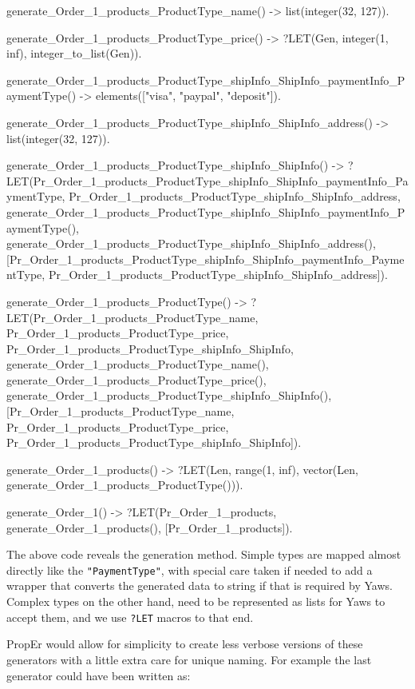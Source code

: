 \documentclass[submission,copyright]{eptcs}
\newcommand{\LET}{\texttt{?LET}\xspace}
\begin{document}
\begin{lsterlang}
generate_Order_1_products_ProductType_name() -> 
  list(integer(32, 127)).

generate_Order_1_products_ProductType_price() ->  
  ?LET(Gen, integer(1, inf), integer_to_list(Gen)).

generate_Order_1_products_ProductType_shipInfo_ShipInfo_paymentInfo_PaymentType() -> 
  elements(["visa", "paypal", "deposit"]).

generate_Order_1_products_ProductType_shipInfo_ShipInfo_address() -> 
  list(integer(32, 127)).

generate_Order_1_products_ProductType_shipInfo_ShipInfo() -> 
  ?LET({Pr_Order_1_products_ProductType_shipInfo_ShipInfo_paymentInfo_PaymentType,
        Pr_Order_1_products_ProductType_shipInfo_ShipInfo_address},
       {generate_Order_1_products_ProductType_shipInfo_ShipInfo_paymentInfo_PaymentType(),
        generate_Order_1_products_ProductType_shipInfo_ShipInfo_address()},
       [Pr_Order_1_products_ProductType_shipInfo_ShipInfo_paymentInfo_PaymentType,
        Pr_Order_1_products_ProductType_shipInfo_ShipInfo_address]).

generate_Order_1_products_ProductType() -> 
  ?LET({Pr_Order_1_products_ProductType_name, 
        Pr_Order_1_products_ProductType_price, 
        Pr_Order_1_products_ProductType_shipInfo_ShipInfo},
       {generate_Order_1_products_ProductType_name(), 
        generate_Order_1_products_ProductType_price(), 
        generate_Order_1_products_ProductType_shipInfo_ShipInfo()},
       [Pr_Order_1_products_ProductType_name, 
        Pr_Order_1_products_ProductType_price, 
        Pr_Order_1_products_ProductType_shipInfo_ShipInfo]).

generate_Order_1_products() -> 
  ?LET(Len, range(1, inf), vector(Len, generate_Order_1_products_ProductType())).

generate_Order_1() -> 
  ?LET(Pr_Order_1_products, generate_Order_1_products(), [Pr_Order_1_products]).
\end{lsterlang}

The above code reveals the generation method. Simple types are mapped
almost directly like the \texttt{"PaymentType"}, with special care
taken if needed to add a wrapper that converts the generated data to
string if that is required by Yaws. Complex types on the other hand,
need to be represented as lists for Yaws to accept them, and we use
\LET macros to that end.

PropEr would allow for simplicity to create less verbose versions of
these generators with a little extra care for unique naming. For
example the last generator could have been written as:
\end{document}
